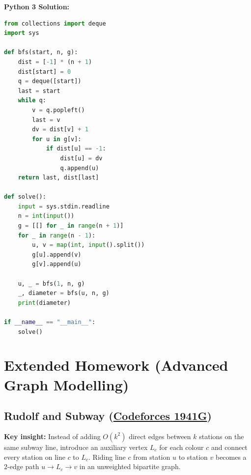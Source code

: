 \documentclass[11pt]{article}
\newcommand{\insight}[1]{\par\medskip\noindent\textbf{Key insight:} #1\par\smallskip}
\begin{document}
\textbf{Python 3 Solution:}
\begin{lstlisting}[language=Python]
from collections import deque
import sys

def bfs(start, n, g):
    dist = [-1] * (n + 1)
    dist[start] = 0
    q = deque([start])
    last = start
    while q:
        v = q.popleft()
        last = v
        dv = dist[v] + 1
        for u in g[v]:
            if dist[u] == -1:
                dist[u] = dv
                q.append(u)
    return last, dist[last]

def solve():
    input = sys.stdin.readline
    n = int(input())
    g = [[] for _ in range(n + 1)]
    for _ in range(n - 1):
        u, v = map(int, input().split())
        g[u].append(v)
        g[v].append(u)

    u, _ = bfs(1, n, g)
    _, diameter = bfs(u, n, g)
    print(diameter)

if __name__ == "__main__":
    solve()
\end{lstlisting}

\section{Extended Homework (Advanced Graph Modelling)}

\subsection{Rudolf and Subway (\href{https://codeforces.com/contest/1941/problem/G}{Codeforces 1941G})}

\insight{Instead of adding $O(k^2)$ direct edges between $k$ stations on the same subway line, introduce an auxiliary vertex $L_c$ for each colour $c$ and connect every station on line $c$ to $L_c$. Riding line $c$ from station $u$ to station $v$ becomes a $2$-edge path $u \to L_c \to v$ in an unweighted bipartite graph.}
\end{document}
